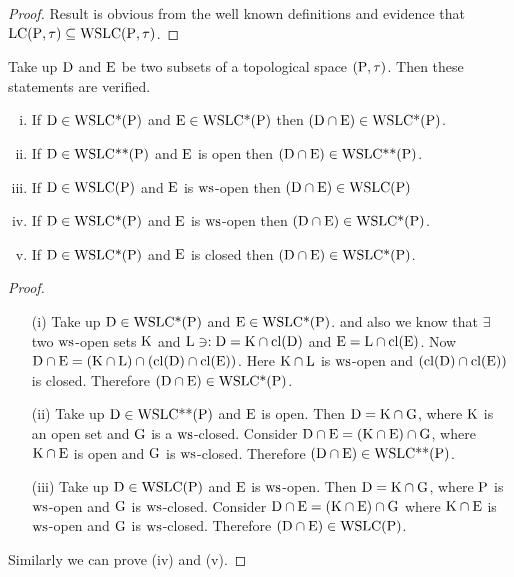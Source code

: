 \begin{proof}
Result is obvious from the well known definitions and evidence that $\mathrm{LC}(\mathrm{P},\tau) \subseteq \mathrm{WSLC}(\mathrm{P},\tau)$.
\end{proof}

\begin{thm}\label{thm7.4.7}
Take up $\mathrm{D}$ and $\mathrm{E}$ be two subsets of a topological space $(\mathrm{P}, \tau)$. Then these statements are verified.
\begin{enumerate}[(i)]
\item If $\mathrm{D} \in \mathrm{WSLC} \text{*} (\mathrm{P})$ and $\mathrm{E} \in \mathrm{WSLC} \text{*} (\mathrm{P})$ then $(\mathrm{D} \cap \mathrm{E}) \in \mathrm{WSLC} \text{*} (\mathrm{P})$.
\item If $\mathrm{D} \in \mathrm{WSLC}\text{{*}{*}}(\mathrm{P})$ and $\mathrm{E}$ is open then $(\mathrm{D} \cap \mathrm{E}) \in \mathrm{WSLC}\text{{*}{*}}(\mathrm{P})$.
\item If $\mathrm{D} \in \mathrm{WSLC}(\mathrm{P})$ and $\mathrm{E}$ is $\mathrm{ws}$-open then $(\mathrm{D} \cap \mathrm{E}) \in \mathrm{WSLC}(\mathrm{P})$
\item If $\mathrm{D} \in \mathrm{WSLC}\text{*}(\mathrm{P})$ and $\mathrm{E}$ is $\mathrm{ws}$-open then $(\mathrm{D} \cap \mathrm{E}) \in \mathrm{WSLC}\text{*}(\mathrm{P})$.
\item If $\mathrm{D} \in \mathrm{WSLC}\text{*}(\mathrm{P})$ and $\mathrm{E}$ is closed then $(\mathrm{D} \cap \mathrm{E}) \in \mathrm{WSLC}\text{*}(\mathrm{P})$.
\end{enumerate}
\end{thm}

\begin{proof}
\begin{itemize}
\item[(i)] Take up $\mathrm{D} \in \mathrm{WSLC}\text{*}(\mathrm{P})$ and $\mathrm{E} \in \mathrm{WSLC}\text{*}(\mathrm{P})$. and also we know that $\exists$ two $\mathrm{ws}$-open sets $\mathrm{K}$ and $\mathrm{L} \ni: \mathrm{D} = \mathrm{K} \cap \mathrm{cl}(\mathrm{D})$ and $\mathrm{E} = \mathrm{L} \cap \mathrm{cl}(\mathrm{E})$. Now $\mathrm{D} \cap \mathrm{E} = (\mathrm{K} \cap \mathrm{L}) \cap (\mathrm{cl}(\mathrm{D}) \cap \mathrm{cl}(\mathrm{E}))$. Here $\mathrm{K} \cap \mathrm{L}$ is $\mathrm{ws}$-open and $(\mathrm{cl}(\mathrm{D}) \cap \mathrm{cl}(\mathrm{E}))$ is closed. Therefore $(\mathrm{D} \cap \mathrm{E}) \in \mathrm{WSLC}\text{*}(\mathrm{P})$.

\item[(ii)] Take up $\mathrm{D} \in \mathrm{WSLC}\text{{*}{*}}(\mathrm{P})$ and $\mathrm{E}$ is open. Then $\mathrm{D} = \mathrm{K} \cap \mathrm{G}$, where $\mathrm{K}$ is an open set and $\mathrm{G}$ is a $\mathrm{ws}$-closed. Consider $\mathrm{D} \cap \mathrm{E} = (\mathrm{K} \cap \mathrm{E}) \cap \mathrm{G}$, where $\mathrm{K} \cap \mathrm{E}$ is open and $\mathrm{G}$ is $\mathrm{ws}$-closed. Therefore $(\mathrm{D} \cap \mathrm{E}) \in \mathrm{WSLC}\text{{*}{*}}(\mathrm{P})$.

\item[(iii)] Take up $\mathrm{D} \in \mathrm{WSLC}(\mathrm{P})$ and $\mathrm{E}$ is $\mathrm{ws}$-open. Then $\mathrm{D} = \mathrm{K} \cap \mathrm{G}$, where $\mathrm{P}$ is $\mathrm{ws}$-open and $\mathrm{G}$ is $\mathrm{ws}$-closed. Consider $\mathrm{D} \cap \mathrm{E} = (\mathrm{K} \cap \mathrm{E}) \cap \mathrm{G}$ where $\mathrm{K} \cap \mathrm{E}$ is $\mathrm{ws}$-open and $\mathrm{G}$ is $\mathrm{ws}$-closed. Therefore $(\mathrm{D} \cap \mathrm{E}) \in \mathrm{WSLC}(\mathrm{P})$.
\end{itemize}
Similarly we can prove (iv) and (v).
\end{proof}
